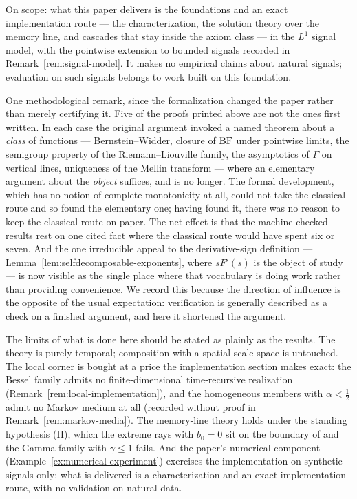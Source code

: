 On scope: what this paper delivers is the foundations and an exact implementation route
--- the characterization, the solution theory over the memory line, and cascades that stay
inside the axiom class --- in the $L^1$ signal model, with the pointwise extension to
bounded signals recorded in Remark~\ref{rem:signal-model}. It makes no empirical claims
about natural signals; evaluation on such signals belongs to work built on this
foundation.

One methodological remark, since the formalization changed the paper rather than merely
certifying it. Five of the proofs printed above are not the ones first written. In each case
the original argument invoked a named theorem about a \emph{class} of functions ---
Bernstein--Widder, closure of $\mathrm{BF}$ under pointwise limits, the semigroup property of the
Riemann--Liouville family, the asymptotics of $\Gamma$ on vertical lines, uniqueness of the
Mellin transform --- where an elementary argument about the \emph{object} suffices, and is no
longer. The formal development, which has no notion of complete monotonicity at all, could
not take the classical route and so found the elementary one; having found it, there was no
reason to keep the classical route on paper. The net effect is that the machine-checked results rest on
one cited fact where the classical route would have spent six or seven. And the one
irreducible appeal to the derivative-sign definition ---
Lemma~\ref{lem:selfdecomposable-exponents}, where $sF'(s)$ is the object of study --- is now
visible as the single place where that vocabulary is doing work rather than providing
convenience. We record this because the direction of influence is the opposite of the usual
expectation: verification is generally described as a check on a finished argument, and here
it shortened the argument.

The limits of what is done here should be stated as plainly as the results. The theory is
purely temporal; composition with a spatial scale space is untouched. The local corner is
bought at a price the implementation section makes exact: the Bessel family admits no
finite-dimensional time-recursive realization
(Remark~\ref{rem:local-implementation}), and the homogeneous members with
$\alpha < \tfrac12$ admit no Markov medium at all (recorded without proof in
Remark~\ref{rem:markov-media}). The memory-line theory holds under the standing hypothesis (H), which
the extreme rays with $b_0 = 0$ sit on the boundary of and the Gamma family with
$\gamma \le 1$ fails. And the paper's numerical component
(Example~\ref{ex:numerical-experiment}) exercises the implementation on synthetic signals
only: what is delivered is a characterization and an exact implementation route, with no
validation on natural data.

